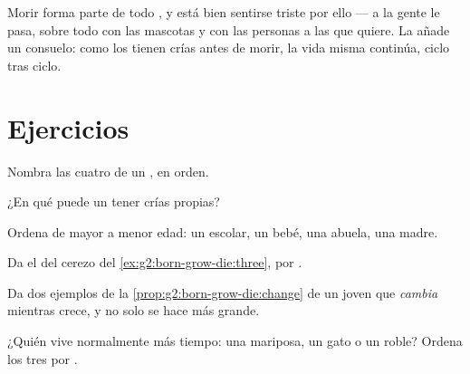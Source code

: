\begin{remark}\label{rem:g2:born-grow-die:death}
Morir forma parte de todo , y está bien sentirse triste
por ello --- a la gente le pasa, sobre todo con las mascotas y con las
personas a las que quiere. La  añade un consuelo: como los
 tienen crías antes de morir, la vida misma continúa, ciclo
tras ciclo.
\end{remark}

\section{Ejercicios}

\begin{exercise}[$\star$]\label{exo:g2:born-grow-die:1}
Nombra las cuatro  de un , en orden.
\end{exercise}

\begin{exercise}[$\star$]\label{exo:g2:born-grow-die:2}
¿En qué  puede un  tener crías propias?
\end{exercise}

\begin{exercise}[$\star$]\label{exo:g2:born-grow-die:3}
Ordena de mayor a menor edad: un escolar, un bebé, una abuela, una
madre.
\end{exercise}

\begin{exercise}[$\star$]\label{exo:g2:born-grow-die:4}
Da el  del cerezo del \cref{ex:g2:born-grow-die:three},
 por .
\end{exercise}

\begin{exercise}[$\star$]\label{exo:g2:born-grow-die:5}
Da dos ejemplos de la \cref{prop:g2:born-grow-die:change} de un  joven que \emph{cambia} mientras crece, y no solo se hace más
grande.
\end{exercise}

\begin{exercise}[$\star$]\label{exo:g2:born-grow-die:6}
¿Quién vive normalmente más tiempo: una mariposa, un gato o un roble?
Ordena los tres por .
\end{exercise}

